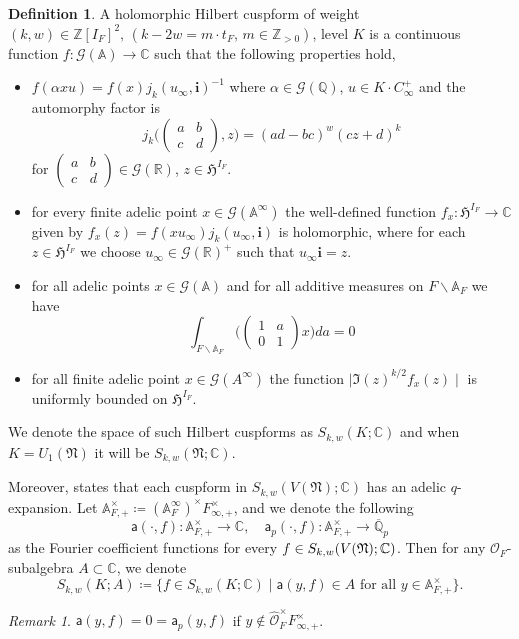 \documentclass[10pt]{amsart}
\numberwithin{equation}{section}
\theoremstyle{definition}
\newtheorem{defn}[thm]{Definition}
\theoremstyle{remark} %
\newtheorem{rmk}[thm]{Remark}
\newcommand{\bb}{\mathbb}
\newcommand{\msf}{\mathsf}
\newcommand{\cal}{\mathcal}
\newcommand{\Oo}{\mathcal{O}}
\newcommand{\Q}{\mathbb{Q}}
\newcommand{\Z}{\mathbb{Z}}
\begin{document}
	\begin{defn}
		A holomorphic Hilbert cuspform of weight $ (k,w)\in \Z[I_F]^2,\, (k-2w = m \cdot t_F,\, m \in \Z_{>0}) $, level $K$ is a continuous function $ f \colon \cal G(\mathbb{A}) \rightarrow \mathbb{C} $ such that the following properties hold,
		\begin{itemize}
			\item $f(\alpha x u) = f(x) j_k(u_\infty,\mathbf{i})^{-1}  $ where $ \alpha \in \cal G(\Q) $, $ u \in K \cdot C_\infty^+$ and the automorphy factor is $$ j_k\Bigg(\begin{pmatrix}
				a &b \\
				c &d
			\end{pmatrix},z\Bigg) = (ad-bc)^w(cz +d)^k $$ for $ \begin{pmatrix}
				a &b \\
				c &d
			\end{pmatrix} \in \cal G(\mathbb{R}) $, $ z \in \mathfrak{H}^{I_F} $.
			
			\item for every finite adelic point $x \in \cal G( \bb{A}^\infty )$ the well-defined function $ f_x \colon \mathfrak{H}^{I_F} \rightarrow \mathbb{C} $ given by $ f_x(z) = f(xu_\infty)j_k(u_\infty, \mathbf{i}) $ is holomorphic, where for each $ z \in \mathfrak{H}^{I_F} $ we choose $ u_\infty \in \cal G(\mathbb{R})^+ $ such that $ u_\infty \mathbf{i} = z $.
			\item for all adelic points $x \in \cal G ( \mathbb{A} )$ and for all additive measures on $F \backslash \mathbb{A}_F$ we have
			$$ \int_{F \backslash \mathbb{A}_F}\Bigg(\begin{pmatrix}
				1 &a \\
				0 &1
			\end{pmatrix}x\Bigg)da= 0 $$
			\item for all finite adelic point $x \in \cal G( A^\infty )$ the function $\mid \Im(z)^{k/2}f_x(z)\mid$ is uniformly bounded on $\mathfrak{H}^{I_F}$.
		\end{itemize}
		We denote the space of such Hilbert cuspforms as $ S_{k,w}(K;\mathbb{C}) $ and when $ K = U_1(\mathfrak{N}) $ it will be $ S_{k,w}(\mathfrak{N};\mathbb{C}) $.
	\end{defn}
	Moreover, \cite[Theorem 1.1]{Hida91} states that each cuspform in $ S_{k,w}(V(\mathfrak{N});\mathbb{C}) $ has an adelic $ q $-expansion. Let $\bb{A}_{F,+}^{\times}\coloneqq (\bb{A}_{F}^{\infty})^\times F^\times_{\infty,+} $, and we denote the following
	\begin{equation*}
		\msf{a}(\cdot,f)\colon \bb{A}_{F,+}^{\times} \to \bb{C}, \quad \msf{a}_p(\cdot,f)\colon \bb{A}_{F,+}^{\times} \to \overline{\bb{Q}}_p
	\end{equation*}
	as the Fourier coefficient functions for every $ f \in S_{k,w}(V(\frak{N});\mathbb{C}) $. Then for any $ \Oo_F $-subalgebra $ A \subset \bb{C} $, we denote
	$$S_{k,w}(K;A) \coloneqq \{ f \in S_{k,w}(K;\mathbb{C}) \mid \msf{a}(y,f) \in A \text{ for all } y \in \bb{A}_{F,+}^{\times} \}.$$ 
	\begin{rmk}
		$ \msf{a}(y,f) = 0 = \msf{a}_p(y,f) $ if $ y \notin \widehat{\Oo}_F^\times F^\times_{\infty, +} $. 	
	\end{rmk}
\end{document}
